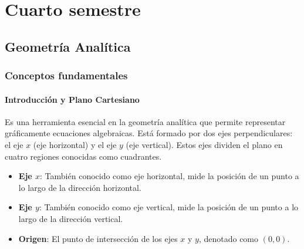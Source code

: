 \part{Cuarto semestre}
\chapter{Geometría Analítica}


\section{Conceptos fundamentales} %
\subsection{Introducción y Plano Cartesiano}

\begin{definition}
Es una herramienta esencial en la geometría analítica que permite representar gráficamente ecuaciones algebraicas. Está formado por dos ejes perpendiculares: el eje \( x \) (eje horizontal) y el eje \( y \) (eje vertical). Estos ejes dividen el plano en cuatro regiones conocidas como cuadrantes.
\end{definition} 

\begin{itemize}
    \item \textbf{Eje \( x \)}: También conocido como eje horizontal, mide la posición de un punto a lo largo de la dirección horizontal.
    \item \textbf{Eje \( y \)}: También conocido como eje vertical, mide la posición de un punto a lo largo de la dirección vertical.
    \item \textbf{Origen}: El punto de intersección de los ejes \( x \) y \( y \), denotado como \( (0,0) \).
\end{itemize}

